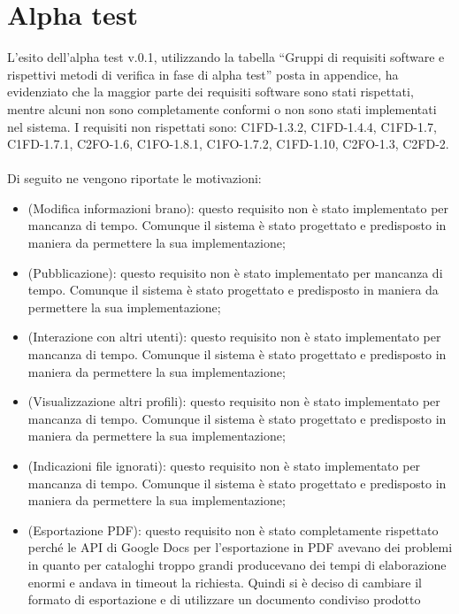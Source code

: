 \section{Alpha test}
L'esito dell'alpha test v.0.1, utilizzando la tabella ``Gruppi di requisiti
software e rispettivi metodi di verifica in fase di alpha test'' posta in
appendice, ha evidenziato che la maggior parte dei requisiti software sono stati
rispettati, mentre alcuni non sono completamente conformi o non sono stati
implementati nel sistema. I requisiti non rispettati sono: C1FD-1.3.2,
C1FD-1.4.4, C1FD-1.7, C1FD-1.7.1, C2FO-1.6, C1FO-1.8.1, C1FO-1.7.2, C1FD-1.10,
C2FO-1.3, C2FD-2.
\\\\
Di seguito ne vengono riportate le motivazioni:
\begin{itemize}
  \item {} (Modifica informazioni brano): questo requisito non \`e
  stato implementato per mancanza di tempo.
  Comunque il sistema \`e stato progettato e predisposto in maniera da
  permettere la sua implementazione;
  \item {} (Pubblicazione): questo requisito non \`e stato
  implementato per mancanza di tempo.
  Comunque il sistema \`e stato progettato e predisposto in maniera da
  permettere la sua implementazione;
  \item {} (Interazione con altri utenti): questo requisito non \`e
  stato implementato per mancanza di tempo.
  Comunque il sistema \`e stato progettato e predisposto in maniera da
  permettere la sua implementazione;
  \item {} (Visualizzazione altri profili): questo requisito non
  \`e stato implementato per mancanza di tempo.
  Comunque il sistema \`e stato progettato e predisposto in maniera da
  permettere la sua implementazione;
  \item {} (Indicazioni file ignorati): questo requisito non \`e
  stato implementato per mancanza di tempo.
  Comunque il sistema \`e stato progettato e predisposto in maniera da
  permettere la sua implementazione;
  \item {} (Esportazione PDF): questo requisito non \`e stato
  completamente rispettato perch\'e le API di Google Docs per
  l'esportazione in PDF avevano dei problemi in quanto per
  cataloghi troppo grandi producevano dei tempi di elaborazione enormi e
  andava in timeout la richiesta. Quindi si \`e deciso di cambiare il
  formato di esportazione e di utilizzare un documento condiviso prodotto

\end{itemize}
